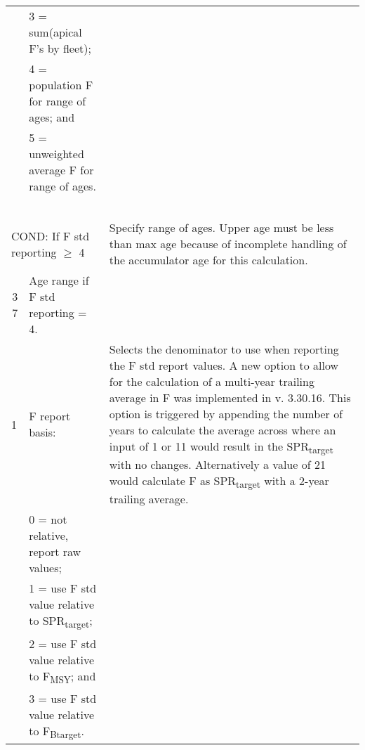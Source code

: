 {\begin{landscape}
\begin{longtable}{p{1.5cm} p{7.2cm} p{12.3cm}}
   & 3 = sum(apical F's by fleet); & \\
   & 4 = population F for range of ages; and & \\
   & 5 = unweighted average F for range of ages. & \\
   & & \\
   & & \\
   & & \\
   & & \\
   & & \\ 
  
 \hline
 \multicolumn{2}{l}{COND: If F std reporting $\geq$ 4 } & \multirow{1}{1cm}[-0.25cm]{\parbox{12.5cm}{Specify range of ages. Upper age must be less than max age because of incomplete handling of the accumulator age for this calculation.}} \Tstrut\\

 \multicolumn{1}{r}{3 7}  & Age range if F std reporting = 4. & \Tstrut\\

 \hline
 1 & F report basis: &  \multirow{1}{1cm}[-0.25cm]{\parbox{12.5cm}{Selects the denominator to use when reporting the F std report values. A new option to allow for the calculation of a multi-year trailing average in F was implemented in v. 3.30.16. This option is triggered by appending the number of years to calculate the average across where an input of 1 or 11 would result in the SPR\textsubscript{target} with no changes.  Alternatively a value of 21 would calculate F as SPR\textsubscript{target} with a 2-year trailing average.}}\Tstrut\\
   & 0 = not relative, report raw values; & \\
   & 1 = use F std value relative to SPR\textsubscript{target}; & \\
   & 2 = use F std value relative to F\textsubscript{MSY}; and & \\
   & 3 = use F std value relative to F\textsubscript{Btarget}. & \Tstrut\\


\end{longtable}
\end{landscape}}
